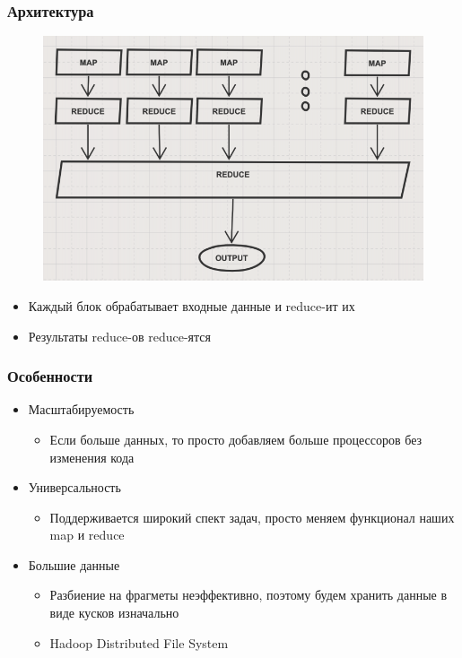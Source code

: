 \documentclass[xetex,mathserif,serif]{beamer}
\begin{document}
\begin{frame}

	\frametitle{Архитектура}
	\begin{figure}[]
		\includegraphics[scale=0.4]{architecture.png}
		\centering
	\end{figure}

	\begin{itemize}
		\item Каждый блок обрабатывает входные данные и reduce-ит их
		\item Результаты reduce-ов reduce-ятся
	\end{itemize}

\end{frame}

\begin{frame}

	\frametitle{Особенности}

	\begin{itemize}
		\item Масштабируемость
		      \begin{itemize}
			      \item Если больше данных, то просто добавляем больше процессоров без изменения кода
		      \end{itemize}
		\item Универсальность
		      \begin{itemize}
			      \item Поддерживается широкий спект задач, просто меняем функционал наших map и reduce
		      \end{itemize}
		\item Большие данные
		      \begin{itemize}
			      \item Разбиение на фрагметы неэффективно, поэтому будем хранить данные в виде кусков изначально
                  \item Hadoop Distributed File System
		      \end{itemize}
	\end{itemize}

\end{frame}
\end{document}
